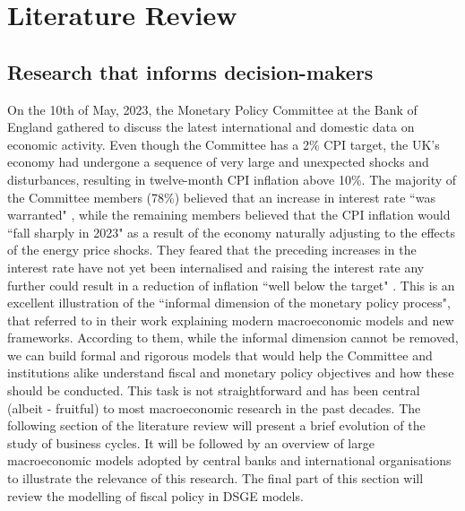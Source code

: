 \section{Literature Review}

\subsection{Research that informs decision-makers}
On the 10th of May, 2023, the Monetary Policy Committee at the Bank of England gathered to discuss the latest international and domestic data on economic activity. Even though the Committee has a 2\% CPI target, the UK's economy had undergone a sequence of very large and unexpected shocks and disturbances, resulting in twelve-month CPI inflation above 10\%. The majority of the Committee members (78\%) believed that an increase in interest rate ``was warranted" \parencite[4]{boe_2023_monetary}, while the remaining members believed that the CPI inflation would ``fall sharply in 2023" \parencite[5]{boe_2023_monetary} as a result of the economy naturally adjusting to the effects of the energy price shocks. They feared that the preceding increases in the interest rate have not yet been internalised and raising the interest rate any further could result in a reduction of inflation ``well below the target" \parencite[5]{boe_2023_monetary}. This is an excellent illustration of the ``informal dimension of the monetary policy process", that \parencite[26]{gals_2007_macroeconomic} referred to in their work explaining modern macroeconomic models and new frameworks. According to them, while the informal dimension cannot be removed, we can build formal and rigorous models that would help the Committee and institutions alike understand fiscal and monetary policy objectives and how these should be conducted. This task is not straightforward and has been central (albeit - fruitful) to most macroeconomic research in the past decades. The following section of the literature review will present a brief evolution of the study of business cycles. It will be followed by an overview of large macroeconomic models adopted by central banks and international organisations to illustrate the relevance of this research. The final part of this section will review the modelling of fiscal policy in DSGE models.

